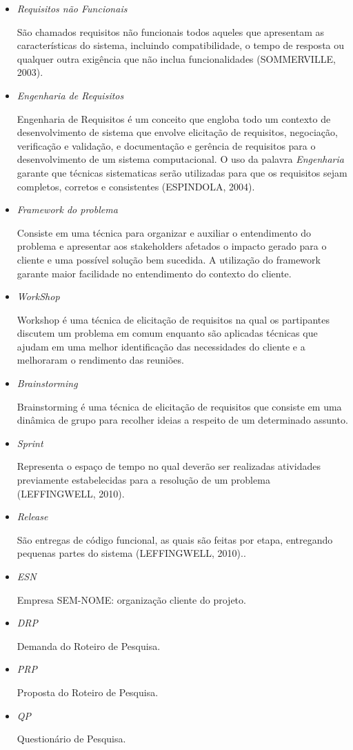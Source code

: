 \begin{itemize}
	\item \textit{Requisitos não Funcionais}

		São chamados requisitos não funcionais todos aqueles que apresentam as características do sistema, incluindo compatibilidade, o tempo de resposta ou qualquer outra exigência que não inclua funcionalidades (SOMMERVILLE, 2003).

	\item \textit{Engenharia de Requisitos}

		Engenharia de Requisitos é um conceito que engloba todo um contexto de desenvolvimento de sistema que envolve elicitação de requisitos, negociação, verificação e validação, e documentação e gerência de requisitos para o desenvolvimento de um sistema computacional. O uso da palavra \textit{Engenharia} garante que técnicas sistematicas serão utilizadas para que os requisitos sejam completos, corretos e consistentes (ESPINDOLA, 2004). 

	\item \textit{Framework do problema}

		Consiste em uma técnica para organizar e auxiliar o entendimento do problema e apresentar aos stakeholders afetados o impacto gerado para o cliente e uma possível solução bem sucedida. A utilização do framework garante maior facilidade no entendimento do contexto do cliente.

 
	\item \textit{WorkShop}

		 Workshop é uma técnica de elicitação de requisitos na qual os partipantes discutem um problema em comum enquanto são aplicadas técnicas que ajudam em uma melhor identificação das necessidades do cliente e a melhoraram o rendimento das reuniões.

	\item \textit{Brainstorming}

		 Brainstorming é uma técnica de elicitação de requisitos que consiste em uma dinâmica de grupo para recolher ideias a respeito de um determinado assunto.

	\item \textit{Sprint}

		Representa o espaço de tempo no qual deverão ser realizadas atividades previamente estabelecidas para a resolução de um problema (LEFFINGWELL, 2010).

	\item \textit{Release}

		São entregas de código funcional, as quais são feitas por etapa, entregando pequenas partes do sistema (LEFFINGWELL, 2010)..

	\item \textit{ESN}

		Empresa SEM-NOME: organização cliente do projeto.

	\item \textit{DRP}

		Demanda do Roteiro de Pesquisa.

	\item \textit{PRP}

		Proposta do Roteiro de Pesquisa.

	\item \textit{QP}

		Questionário de Pesquisa.

\end{itemize}